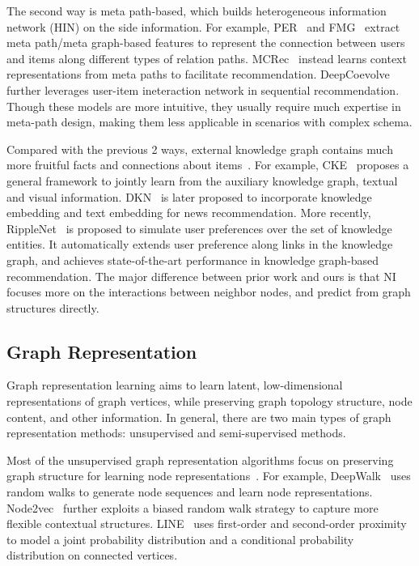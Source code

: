 \documentclass[sigconf]{acmart}
\begin{document}
The second way is meta path-based, which builds heterogeneous information network (HIN) on the side information. 
For example, PER~\cite{yu2014personalized} and FMG~\cite{zhao2017meta} extract meta path/meta graph-based features to represent the connection between users and items along different types of relation paths.
MCRec~\cite{hu2018leveraging} instead learns context representations from meta paths to facilitate recommendation. 
DeepCoevolve~\cite{dai2016deep} further leverages user-item ineteraction network in sequential recommendation. 
Though these models are more intuitive, they usually require much expertise in meta-path design, making them less applicable in scenarios with complex schema. 

Compared with the previous 2 ways, external knowledge graph contains much more fruitful facts and connections about items~\cite{bollacker2008freebase}.
For example, CKE~\cite{zhang2016collaborative} proposes a general framework to jointly learn from the auxiliary knowledge graph, textual and visual information. 
DKN~\cite{wang2018dkn} is later proposed to incorporate knowledge embedding and text embedding for news recommendation. 
More recently, RippleNet~\cite{wang2018ripplenet} is proposed to simulate user preferences over the set of knowledge entities. It automatically extends user preference along links in the knowledge graph, and achieves state-of-the-art performance in knowledge graph-based recommendation. 
The major difference between prior work and ours is that NI focuses more on the interactions between neighbor nodes, and predict from graph structures directly.

\subsection{Graph Representation}
Graph representation learning aims to learn latent, low-dimensional representations of graph vertices, while preserving graph topology structure, node content, and other information.
In general, there are two main types of graph representation methods: unsupervised and semi-supervised methods. 

Most of the unsupervised graph representation algorithms focus on preserving graph structure for learning node representations~\cite{perozzi2014deepwalk, grover2016node2vec, tang2015line}. For example, DeepWalk~\cite{perozzi2014deepwalk} uses random walks to generate node sequences and learn node representations. Node2vec~\cite{grover2016node2vec} further exploits a biased random walk strategy to capture more flexible contextual structures. LINE~\cite{tang2015line} uses first-order and second-order proximity to model a joint probability distribution and a conditional probability distribution on connected vertices. 
\end{document}
